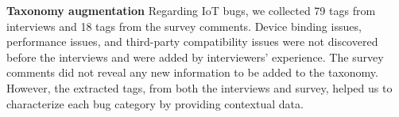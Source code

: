\textbf{Taxonomy augmentation}
Regarding IoT bugs, we collected 79 tags from interviews and 18 tags from the survey comments. Device binding issues, performance issues, and third-party compatibility issues were not discovered before the interviews and were added by interviewers' experience. The survey comments did not reveal any new information to be added to the taxonomy. However, the extracted tags, from both the interviews and survey, helped us to characterize each bug category by providing contextual data.



\endinput

